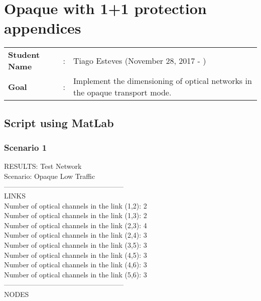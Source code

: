 \clearpage

\section{Opaque with 1+1 protection appendices}
\begin{tcolorbox}	
\begin{tabular}{p{2.75cm} p{0.2cm} p{10.5cm}} 	
\textbf{Student Name}  &:& Tiago Esteves    (November 28, 2017 - )\\
\textbf{Goal}          &:& Implement the dimensioning of optical networks in the opaque transport mode.
\end{tabular}
\end{tcolorbox}


\subsection{Script using MatLab}

\subsubsection{Scenario 1}

\qquad RESULTS: Test Network \\

\quad Scenario: Opaque Low Traffic \\

---------------------------------------------------\\
LINKS\\

Number of optical channels in the link (1,2): 2 \\
\qquad Number of optical channels in the link (1,3): 2 \\
\qquad Number of optical channels in the link (2,3): 4 \\
\qquad Number of optical channels in the link (2,4): 3 \\
\qquad Number of optical channels in the link (3,5): 3 \\
\qquad Number of optical channels in the link (4,5): 3 \\
\qquad Number of optical channels in the link (4,6): 3 \\
\qquad Number of optical channels in the link (5,6): 3 \\

---------------------------------------------------\\
NODES\\

